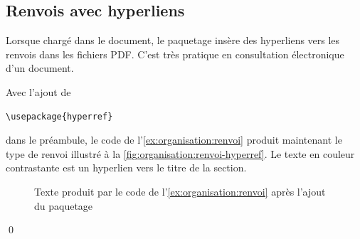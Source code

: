 \subsection{Renvois avec hyperliens}
\label{sec:organisation:renvois:hyperliens}

Lorsque chargé dans le document, le paquetage  insère
des hyperliens vers les renvois dans les fichiers PDF. C'est très
pratique en consultation électronique d'un document.

\begin{exemple}
  \label{ex:organisation:renvoi-hyperref}
  Avec l'ajout de
\begin{lstlisting}
\usepackage{hyperref}
\end{lstlisting}
  dans le préambule, le code de l'\autoref{ex:organisation:renvoi}
  produit maintenant le type de renvoi illustré à la
  \autoref{fig:organisation:renvoi-hyperref}. Le texte en couleur
  contrastante est un hyperlien vers le titre de la section.

  \begin{figure}
    \centering
    \caption{Texte produit par le code de
      l'\autoref{ex:organisation:renvoi} après l'ajout du paquetage
      }
    \label{fig:organisation:renvoi-hyperref}
  \end{figure}
  \qed
\end{exemple}


